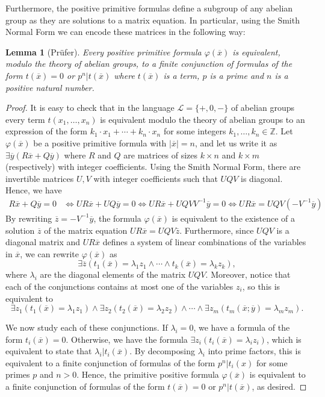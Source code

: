 \documentclass[11pt]{amsart}
\newtheorem{lema}[prop]{Lemma}
\theoremstyle{definition}
\newcommand{\bl}{\begin{lema}}
\newcommand{\el}{\end{lema}}
\newcommand{\bdem}{\begin{proof}}
\newcommand{\edem}{\end{proof}}
\newcommand{\ov}[1]{\overline{#1}}
\newcommand{\Le}{\mathcal{L}}
\begin{document}
Furthermore, the positive primitive formulas define a subgroup of any abelian group as they are solutions to a matrix equation. In particular, using the Smith Normal Form we can encode these matrices in the following way:
\bl [Prüfer] \label{PruferPPF} Every positive primitive formula $\varphi(\ov{x})$ is equivalent, modulo the theory of abelian groups, to a finite conjunction of formulas of the form $t(\ov{x})=0$ or $p^n|t(\ov{x})$ where $t(\ov{x})$ is a term, $p$ is a prime and $n$ is a positive natural number.
\el
\bdem It is easy to check that in the language $\Le=\{+,0,-\}$ of abelian groups every term $t(x_1,\ldots,x_n)$ is equivalent modulo the theory of abelian groups to an expression of the form $k_1\cdot x_1+\cdots+k_n\cdot x_n$ for some integers $k_1,\ldots,k_n\in\mathbb{Z}$. Let $\varphi(\ov{x})$ be a positive primitive formula with $|\ov{x}|=n$, and let us write it as $\exists \ov{y}(R\ov{x}+Q\ov{y})$ where $R$ and $Q$ are matrices of sizes $k\times n$ and $k\times m$ (respectively) with integer coefficients. Using the Smith Normal Form, there are invertible matrices $U,V$ with integer coefficients such that $UQV$ is diagonal. Hence, we have
\begin{align*}
R\ov{x}+Q\ov{y}=0&\Leftrightarrow UR\ov{x}+UQ\ov{y}=0\Leftrightarrow UR\ov{x}+UQVV^{-1}\ov{y}=0\Leftrightarrow UR\ov{x}=UQV(-V^{-1}\ov{y})
\end{align*}
By rewriting $\ov{z}=-V^{-1}\ov{y}$, the formula $\varphi(\ov{x})$ is equivalent to the existence of a solution $\ov{z}$ of the matrix equation $UR\ov{x}=UQV\ov{z}$. Furthermore, since $UQV$ is a diagonal matrix and $UR\ov{x}$ defines a system of linear combinations of the variables in $\ov{x}$, we can rewrite $\varphi(\ov{x})$ as
\[\exists \ov{z}(t_1(\ov{x})=\lambda_1z_1\wedge \cdots \wedge t_k(\ov{x})=\lambda_kz_k),\]
where $\lambda_i$ are the diagonal elements of the matrix $UQV$. Moreover, notice that each of the conjunctions contains at most one of the variables $z_i$, so this is equivalent to
\[\exists z_1(t_1(\ov{x})=\lambda_1z_1) \wedge \exists z_2(t_2(\ov{x})=\lambda_2z_2)\wedge \cdots \wedge \exists z_m(t_m(\ov{x};\ov{y})=\lambda_mz_m).\]

We now study each of these conjunctions. If $\lambda_i=0$, we have a formula of the form $t_i(\ov{x})=0$. Otherwise, we have the formula $\exists z_i(t_i(\ov{x})=\lambda_iz_i)$, which is equivalent to state that $\lambda_i|t_i(\ov{x})$. By decomposing $\lambda_i$ into prime factors, this is equivalent to a finite conjunction of formulas of the form $p^n|t_i(x)$ for some primes $p$ and $n>0$. Hence, the primitive positive formula $\varphi(\ov{x})$ is equivalent to a finite conjunction of formulas of the form $t(\ov{x})=0$ or $p^n|t(\ov{x})$, as desired.
\edem
\end{document}
